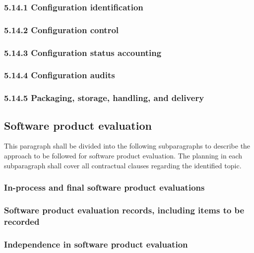 \subsubsection{5.14.1 Configuration identification}

\subsubsection{5.14.2 Configuration control}

\subsubsection{5.14.3 Configuration status accounting}

\subsubsection{5.14.4 Configuration audits}

\subsubsection{5.14.5 Packaging, storage, handling, and delivery}

\subsection{Software product evaluation}

This paragraph shall be divided into the following subparagraphs to
describe the approach to be followed for software product evaluation.
The planning in each subparagraph shall cover all contractual clauses
regarding the identified topic.

\subsubsection{In-process and final software product evaluations}

\subsubsection{Software product evaluation records, including items to
be recorded}

\subsubsection{Independence in software product evaluation}

